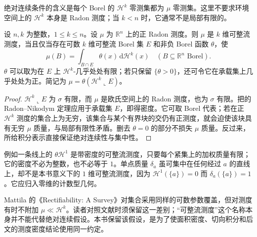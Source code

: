绝对连续条件的含义是每个 Borel 的 \(\mathcal H^k\) 零测集都为 \(\mu\) 零测集。这里不要求环境空间上的 \(\mathcal H^k\) 本身是 Radon 测度；当 \(k<n\) 时，它通常不是局部有限的。

\begin{proposition}\label{b1:prop:rectifiable-measure-density}
设 \(n,k\) 为整数，\(1\leq k\leq n\)。设 \(\mu\) 为 \(\mathbb R^n\) 上的正 Radon 测度。则 \(\mu\) 是 \(k\) 维可整流测度，当且仅当存在可数 \(k\) 维可整流 Borel 集 \(E\) 和非负 Borel 函数 \(\theta\)，使
\[
 \mu(B)=\int_{B\cap E}\theta(x)\,\mathrm d\mathcal H^k(x)
 \quad(B\subseteq\mathbb R^n\text{ Borel}).
\]
\(\theta\) 可以取为在 \(E\) 上 \(\mathcal H^k\)-几乎处处有限；若只保留 \(\{\theta>0\}\)，还可令它在承载集上几乎处处为正。简记为 \(\mu=\theta(\mathcal H^k\llcorner E)\)。
\end{proposition}
\begin{proof}
\(\mathcal H^k\llcorner E\) 为 \(\sigma\) 有限，而 \(\mu\) 是欧氏空间上的 Radon 测度，也为 \(\sigma\) 有限。把的 Radon--Nikodym 定理应用于承载集 \(E\)，即得密度。它可取 Borel 代表；若在正 \(\mathcal H^k\) 测度的集合上为无穷，该集合与某个有界块的交仍有正测度，就会迫使该块具有无穷 \(\mu\) 质量，与局部有限性矛盾。删去 \(\theta=0\) 的部分不损失 \(\mu\) 质量。反过来，所给积分表示直接保证绝对连续性与集中性。
\end{proof}

例如一条线上的 \(\theta\mathcal H^1\) 是带密度的可整流测度，只要每个紧集上的加权质量有限；它的密度不必为整数，也不必等于 \(1\)。单点质量 \(\delta_a\) 虽可集中在任何经过 \(a\) 的直线上，却不是本书意义下的 \(1\) 维可整流测度，因为 \(\mathcal H^1(\{a\})=0\) 而 \(\delta_a(\{a\})=1\)。它应归入零维的计数型几何。

\ProseParagraphBreak

Mattila 的《Rectifiability: A Survey》\cite[Definitions 4.1--4.2 and the discussion on p. 19]{Mattila2023Rectifiability}对集合采用同样的可数参数覆盖，但对测度有时不附加 \(\mu\ll\mathcal H^k\)。读者对照文献时须保留这一差别；“可整流测度”这个名称本身并不能代替绝对连续假设。本书保留该假设，是为了使面积密度、切向积分和后文的测度密度结论使用同一约定。
